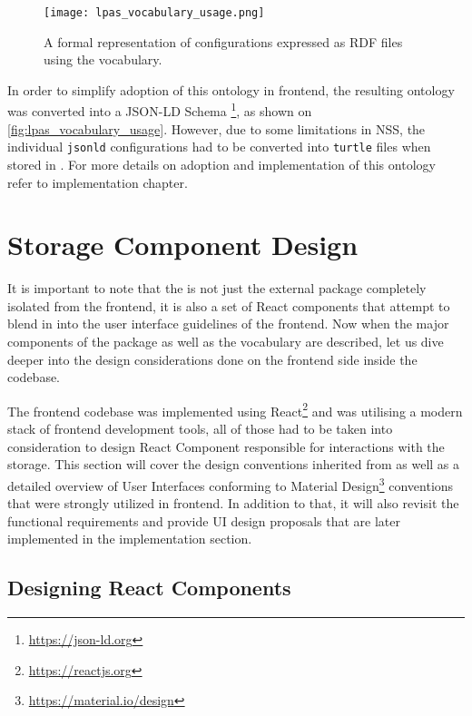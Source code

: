 \begin{figure}[h]
\centering
\texttt{[image: lpas\_vocabulary\_usage.png]}
\caption{A formal representation of \lpa{} configurations expressed as RDF files using the \lpas{} vocabulary.}
\label{fig:lpas_vocabulary_usage}
\end{figure}

In order to simplify adoption of this ontology in \lpa{} frontend, the resulting ontology was converted into a JSON-LD Schema \footnote{\url{https://json-ld.org}}, as shown on \autoref{fig:lpas_vocabulary_usage}. However, due to some limitations in NSS, the individual \texttt{jsonld} configurations had to be converted into \texttt{turtle} files when stored in \solid{}. For more details on adoption and  implementation of this ontology refer to implementation chapter.


\section{Storage Component Design}
\label{ssec:lpas_storage_component_design}

It is important to note that the \lpas{} is not just the external package completely isolated from the \lpa{} frontend, it is also a set of React components that attempt to blend in into the user interface guidelines of the frontend. Now when the major components of the \lpas{} package as well as the \lpas{} vocabulary are described, let us dive deeper into the design considerations done on the frontend side inside the \lpa{} codebase. 

The \lpa{} frontend codebase was implemented using React\footnote{\url{https://reactjs.org}} and was utilising a modern stack of frontend development tools, all of those had to be taken into consideration to design React Component responsible for interactions with the storage. This section will cover the design conventions inherited from \lpa{} as well as a detailed overview of User Interfaces conforming to Material Design\footnote{\url{https://material.io/design}} conventions that were strongly utilized in \lpa{} frontend. In addition to that, it will also revisit the functional requirements and provide UI design proposals that are later implemented in the implementation section.

\subsection{Designing React Components}

